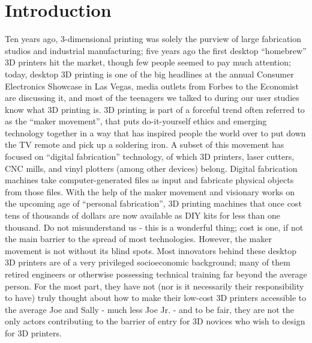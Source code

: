 \chapter{Introduction}
\label{introchap}



Ten years ago, 3-dimensional printing was solely the purview of large
fabrication studios and industrial manufacturing; five years ago the first
desktop ``homebrew'' 3D printers hit the market, though few people seemed to pay
much attention; today, desktop 3D printing is one of the big headlines at the
annual Consumer Electronics Showcase in Las Vegas, media outlets from
Forbes\cite{forbes} to the Economist\cite{economist} are discussing it, and most
of the teenagers we talked to during our user studies know what 3D printing is.
3D printing is part of a forceful trend often referred to as the ``maker
movement''\cite{anderson2012makers}, that puts do-it-yourself ethics and
emerging technology together in a way that has inspired people the world over to
put down the TV remote and pick up a soldering iron. A subset of this movement
has focused on ``digital fabrication'' technology, of which 3D printers, laser
cutters, CNC mills, and vinyl plotters (among other devices) belong. Digital
fabrication machines take computer-generated files as input and fabricate
physical objects from those files. With the help of the maker movement and
visionary works on the upcoming age of ``personal
fabrication''\cite{Gershenfeld:2007:FCR:1211574}, 3D printing machines that once
cost tens of thousands of dollars are now available as DIY kits for less than
one thousand. Do not misunderstand us - this is a wonderful thing; cost is one,
if not the main barrier to the spread of most technologies.
However, the maker movement is not without its blind spots. Most innovators
behind these desktop 3D printers are of a very privileged socioeconomic
background; many of them retired engineers or otherwise possessing technical
training far beyond the average person. For the most part, they have not (nor is
it necessarily their responsibility to have) truly thought about how to make
their low-cost 3D printers accessible to the average Joe and Sally - much less
Joe Jr. - and to be fair, they are not the only actors contributing to the
barrier of entry for 3D novices who wish to design for 3D printers.

